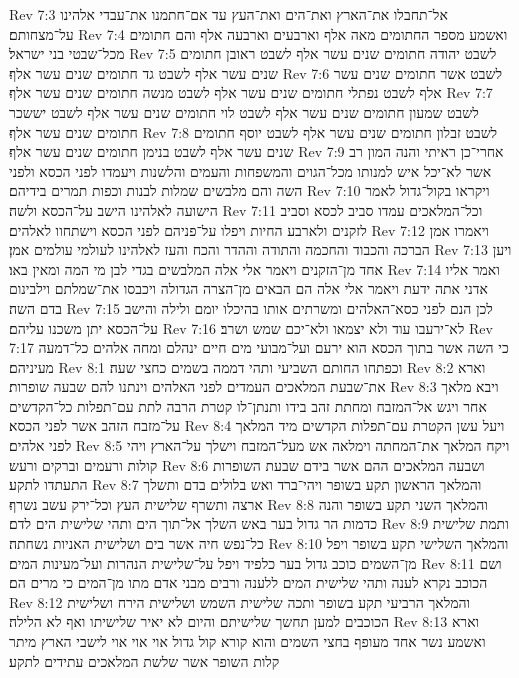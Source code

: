 Rev 7:3  אל־תחבלו את־הארץ ואת־הים ואת־העץ עד אם־חתמנו את־עבדי אלהינו על־מצחותם׃
Rev 7:4  ואשמע מספר החתומים מאה אלף וארבעים וארבעה אלף והם חתומים מכל־שבטי בני ישראל׃
Rev 7:5  לשבט יהודה חתומים שנים עשר אלף לשבט ראובן חתומים שנים עשר אלף לשבט גד חתומים שנים עשר אלף׃
Rev 7:6  לשבט אשר חתומים שנים עשר אלף לשבט נפתלי חתומים שנים עשר אלף לשבט מנשה חתומים שנים עשר אלף׃
Rev 7:7  לשבט שמעון חתומים שנים עשר אלף לשבט לוי חתומים שנים עשר אלף לשבט יששכר חתומים שנים עשר אלף׃
Rev 7:8  לשבט זבלון חתומים שנים עשר אלף לשבט יוסף חתומים שנים עשר אלף לשבט בנימן חתומים שנים עשר אלף׃
Rev 7:9  אחרי־כן ראיתי והנה המון רב אשר לא־יכל איש למנותו מכל־הגוים והמשפחות והעמים והלשנות ויעמדו לפני הכסא ולפני השה והם מלבשים שמלות לבנות וכפות תמרים בידיהם׃
Rev 7:10  ויקראו בקול־גדול לאמר הישועה לאלהינו הישב על־הכסא ולשה׃
Rev 7:11  וכל־המלאכים עמדו סביב לכסא וסביב לזקנים ולארבע החיות ויפלו על־פניהם לפני הכסא וישתחוו לאלהים׃
Rev 7:12  ויאמרו אמן הברכה והכבוד והחכמה והתודה וההדר והכח והעז לאלהינו לעולמי עולמים אמן׃
Rev 7:13  ויען אחד מן־הזקנים ויאמר אלי אלה המלבשים בגדי לבן מי המה ומאין באו׃
Rev 7:14  ואמר אליו אדני אתה ידעת ויאמר אלי אלה הם הבאים מן־הצרה הגדולה ויכבסו את־שמלתם וילבינום בדם השה׃
Rev 7:15  לכן הנם לפני כסא־האלהים ומשרתים אותו בהיכלו יומם ולילה והישב על־הכסא יתן משכנו עליהם׃
Rev 7:16  לא־ירעבו עוד ולא יצמאו ולא־יכם שמש ושרב׃
Rev 7:17  כי השה אשר בתוך הכסא הוא ירעם ועל־מבועי מים חיים ינהלם ומחה אלהים כל־דמעה מעיניהם׃
Rev 8:1  וכפתחו החותם השביעי ותהי דממה בשמים כחצי שעה׃
Rev 8:2  וארא את־שבעת המלאכים העמדים לפני האלהים וינתנו להם שבעה שופרות׃
Rev 8:3  ויבא מלאך אחר ויגש אל־המזבח ומחתת זהב בידו ותנתן־לו קטרת הרבה לתת עם־תפלות כל־הקדשים על־מזבח הזהב אשר לפני הכסא׃
Rev 8:4  ויעל עשן הקטרת עם־תפלות הקדשים מיד המלאך לפני אלהים׃
Rev 8:5  ויקח המלאך את־המחתה וימלאה אש מעל־המזבח וישלך על־הארץ ויהי קולות ורעמים וברקים ורעש׃
Rev 8:6  ושבעה המלאכים ההם אשר בידם שבעת השופרות התעתדו לתקע׃
Rev 8:7  והמלאך הראשון תקע בשופר ויהי־ברד ואש בלולים בדם ותשלך ארצה ותשרף שלישית העץ וכל־ירק עשב נשרף׃
Rev 8:8  והמלאך השני תקע בשופר והנה כדמות הר גדול בער באש השלך אל־תוך הים ותהי שלישית הים לדם׃
Rev 8:9  ותמת שלישית כל־נפש חיה אשר בים ושלישית האניות נשחתה׃
Rev 8:10  והמלאך השלישי תקע בשופר ויפל מן־השמים כוכב גדול בער כלפיד ויפל על־שלישית הנהרות ועל־מעינות המים׃
Rev 8:11  ושם הכוכב נקרא לענה ותהי שלישית המים ללענה ורבים מבני אדם מתו מן־המים כי מרים הם׃
Rev 8:12  והמלאך הרביעי תקע בשופר ותכה שלישית השמש ושלישית הירח ושלישית הכוכבים למען תחשך שלישיתם והיום לא יאיר שלישיתו ואף לא הלילה׃
Rev 8:13  וארא ואשמע נשר אחד מעופף בחצי השמים והוא קורא קול גדול אוי אוי אוי לישבי הארץ מיתר קלות השופר אשר שלשת המלאכים עתידים לתקע׃
